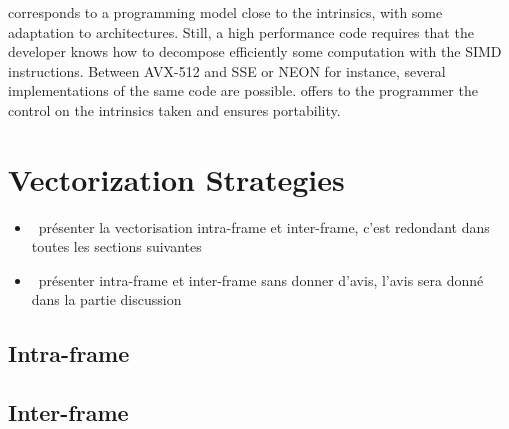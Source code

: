 \MIPP corresponds to a programming model close to the intrinsics, with some
adaptation to architectures. Still, a high performance code requires that the
developer knows how to decompose efficiently some computation with the SIMD
instructions. Between AVX-512 and SSE or NEON for instance, several
implementations of the same code are possible. \MIPP offers to the programmer
the control on the intrinsics taken and ensures portability.

\section{Vectorization Strategies}
\label{sec:opt_vec_strat}

\begin{itemize}
  \item \xmark~présenter la vectorisation intra-frame et inter-frame, c'est
    redondant dans toutes les sections suivantes
  \item \xmark~présenter intra-frame et inter-frame sans donner d'avis, l'avis
    sera donné dans la partie discussion
\end{itemize}

\subsection{Intra-frame}
\label{sec:opt_vec_strat_intra}

\subsection{Inter-frame}
\label{sec:opt_vec_strat_inter}

